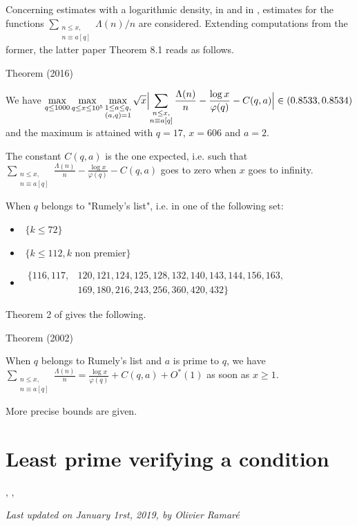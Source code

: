 \par 
Concerning estimates with a logarithmic density, in
\cite{Ramare*02}
and in
\cite{Ramare*12-0},
estimates for the functions
$\displaystyle\sum_{\substack{n\le x,\\ n\equiv a[q]}}\Lambda(n)/n$
are considered.
Extending computations from the former, the latter paper Theorem 8.1
reads as follows.
\begin{thm}{Theorem (2016)}

  We have
  $\displaystyle
  \max_{q\le 1000}\max_{q\le x\le 10^5}\max_{\substack{1\le a\le q,\\
  (a,q)=1}}
  \sqrt{x}\Bigl|
  \sum_{\substack{n\le x,\\ n\equiv a[q]}}\frac{\Lambda(n)}{n}
  -\frac{\log x}{\varphi(q)}-C(q,a)\Bigr|\in(0.8533,0.8534)
  $
  and the maximum is attained with $q=17$, $x=606$ and $a=2$.
\end{thm}

The constant $C(q,a)$ is the one expected, i.e. such that
$\sum_{\substack{n\le x,\\ n\equiv a[q]}}\frac{\Lambda(n)}{n}
-\frac{\log x}{\varphi(q)}-C(q,a)$ goes to
zero when $x$ goes to infinity.

\par 
  When $q$ belongs to "Rumely's list", i.e. in one of the
following set:
\begin{itemize}
    \item \,\,$\{k\le 72\}$

    \item \,\,$\{k\le 112, \text{$k$ non premier}\}$

    \item \,$\begin{aligned}\{116, 117, &120, 121, 124, 125, 128, 132, 140,
     143, 144, 156, 163, \\ &169, 180, 216, 243, 256, 360, 420, 432\}\end{aligned}$

\end{itemize}
Theorem 2 of
\cite{Ramare*02}
gives the following.
\begin{thm}{Theorem (2002)}

  When $q$ belongs to Rumely's list and $a$ is prime to $q$, we have
  $\displaystyle
  \sum_{\substack{n\le x,\\ n\equiv a[q]}}\frac{\Lambda(n)}{n}
  =\frac{\log x}{\varphi(q)}+C(q,a)+O^*(1)
  $
  as soon as $x\ge1$.
\end{thm}

More precise bounds are given.




\section{Least prime verifying a condition}


\cite{Bach-Sorenson*96},
\cite{Kadiri*05-2},







  
\begin{flushright}\small\sl{}   Last updated on January 1rst, 2019, by Olivier Ramar\'e
 \end{flushright}
















